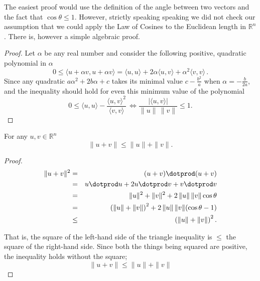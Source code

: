 The easiest proof would use the definition of the angle between two vectors and the fact that $\cos \theta \leq 1$. However, strictly speaking speaking we did not check our assumption that we could apply the Law of Cosines
to the Euclidean length in ${\mathbb R}^n$. There is, however a simple algebraic proof. 
\begin{proof}
Let $\alpha$ be any
real number and consider the following positive, quadratic polynomial in $\alpha$
\[
0\leq \langle u+\alpha v,u+\alpha v\rangle = \langle u,u\rangle +2\alpha \langle u,v\rangle +\alpha^2 \langle v,v\rangle\, .
\]
Since any quadratic $a\alpha^2 + 2b \alpha + c$ takes its minimal value
$c-\frac{b^2}{a}$
when $\alpha=-\frac{b}{2a}$,  and the inequality should hold for even this minimum value of the polynomial 
\[
0\leq \langle u,u\rangle -\frac{\langle u,v\rangle^2}{\langle v,v\rangle}\, 
\Leftrightarrow 
\frac{|\langle u,v \rangle|}{\|u\|\, \|v\|} \leq 1.
\]
\end{proof}

\begin{theorem}
For any $u,v\in \mathbb{R}^n$
\[ \|u+v\| \leq \|u\| + \|v\| .\]
\end{theorem}

\begin{proof}

\begin{eqnarray*}
\|u+v\|^2 & = & (u+v)\dotprod (u+v) \\
 	& = & u\dotprod u + 2 u\dotprod v + v\dotprod v \\
	& = & \|u\|^2 + \|v\|^2 + 2\,  \|u\|\,  \|v\| \cos \theta \\
	& = & \left(\|u\| + \|v\|\right)^2 + 2 \, \|u\| \, \|v\| (\cos \theta -1) \\
	& \leq & \left(\|u\| + \|v\|\right)^2	.
\end{eqnarray*}

\noindent
That is, the square of the left-hand side of the triangle inequality is $\leq$ the square of the right-hand side. Since both the things being squared are positive, the inequality holds without the square;
\[ \|u+v\| \leq  \|u\| + \|v\|   \]

\end{proof}

